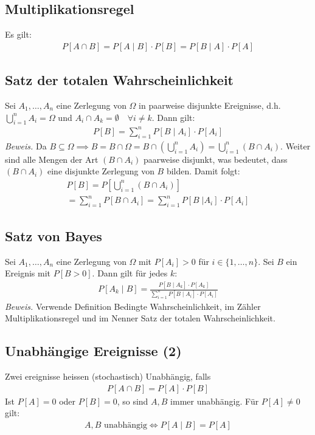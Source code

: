 \documentclass[8pt]{extarticle}
\newcommand{\Sn}{\sum_{i = 1}^n}
\newcommand{\cond}[2]{P[#1 \; | \; #2]}
\begin{document}
\begin{multicols*}{3}
  \subsection*{Multiplikationsregel}
  Es gilt:
  \begin{align*}
    P[A \cap B] = P[A \;|\; B] \cdot P[B] = P[B \;|\; A] \cdot P[A]
  \end{align*}
  \subsection*{Satz der totalen Wahrscheinlichkeit}
  Sei $A_1, \dots, A_n$ eine Zerlegung von $\Omega$ in paarweise
  disjunkte Ereignisse, d.h. $\bigcup_{i = 1}^n A_i = \Omega$
  und $A_i \cap A_k = \emptyset \quad \forall i \neq k$. Dann
  gilt:
  \begin{align*}
    P[B] = \sum_{i = 1}^n P[B \; | \; A_i] \cdot P[A_i]
  \end{align*}
  \emph{Beweis.}
  Da $B \subseteq \Omega \implies B = B \cap \Omega
    = B \cap (\bigcup_{i=1}^n A_i) = \bigcup_{i = 1}^n (B \cap A_i)$.
  Weiter sind alle Mengen der Art $(B \cap A_i)$ paarweise disjunkt,
  was bedeutet, dass $(B \cap A_i)$ eine disjunkte Zerlegung von $B$
  bilden. Damit folgt:
  \begin{align*}
    P[B] = P \left[ \bigcup_{i = 1}^n (B \cap A_i)\right] \\
    = \Sn P[B \cap A_i] = \sum_{i = 1}^n P[B \; | A_i] \cdot P[A_i]
  \end{align*}
  \subsection*{Satz von Bayes}
  Sei $A_1, \dots, A_n$ eine Zerlegung von $\Omega$ mit $P[A_i] > 0$
  für $i \in \{1, \dots, n\}$. Sei $B$ ein Ereignis mit $P[B > 0]$.
  Dann gilt für jedes $k$:
  \begin{align*}
    \cond{A_k}{B} = \frac{\cond{B}{A_k} \cdot P[A_k] }{\Sn \cond{B}{A_i} \cdot P[A_i]}
  \end{align*}
  \emph{Beweis.} Verwende Definition Bedingte Wahrscheinlichkeit,
  im Zähler Multiplikationsregel und im Nenner Satz der totalen Wahrscheinlichkeit.
  \subsection*{Unabhängige Ereignisse (2)}
  Zwei ereignisse heissen (stochastisch) Unabhängig, falls
  \begin{align*}
    P[A \cap B] = P[A] \cdot P[B]
  \end{align*}
  Ist $P[A] = 0$ oder $P[B] = 0$, so sind $A, B$ immer unabhängig.
  Für $P[A] \neq 0$ gilt:
  \begin{align*}
    A, B \text{ unabhängig} \Longleftrightarrow \cond{A}{B} = P[A]
  \end{align*}

\end{multicols*}
\end{document}
